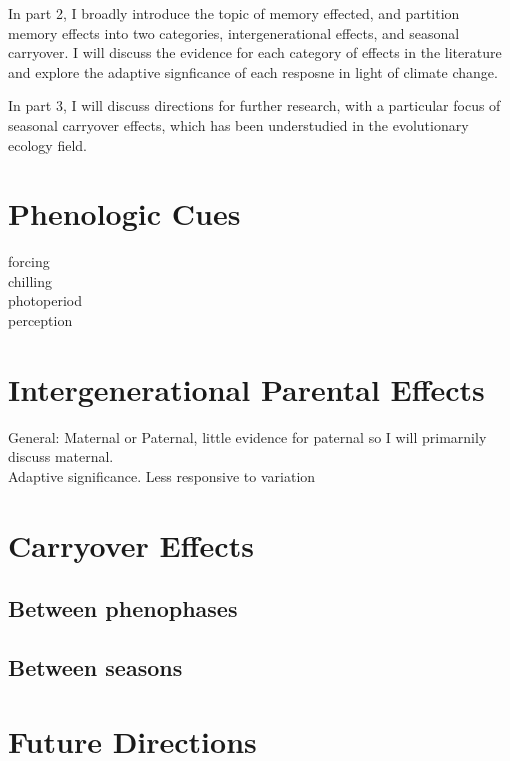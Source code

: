 \documentclass{article}\usepackage[]{graphicx}\usepackage[]{color}
\begin{document}
\par In part 2, I broadly introduce the topic of memory effected, and partition memory effects into two categories, intergenerational effects, and seasonal carryover. I will discuss the evidence for each category of effects in the literature and explore the adaptive signficance of each resposne in light of climate change.\\
\par In part 3, I will discuss directions for further research, with a particular focus of seasonal carryover effects, which has been understudied in the evolutionary ecology field.\\
\section{Phenologic Cues}
forcing\\
chilling\\
photoperiod\\
perception\\
\section{Intergenerational Parental Effects}
General: Maternal or Paternal, little evidence for paternal so I will primarnily discuss maternal.\\
Adaptive significance. Less responsive to variation\\
\section{Carryover Effects}
\subsection{Between phenophases}
\subsection{Between seasons}
\section{Future Directions}
\end{document}

